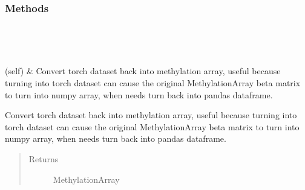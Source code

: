 \documentclass[letterpaper,10pt,english]{sphinxmanual}
\begin{document}
\begin{fulllineitems}
\begin{quote}
\begin{description}
\begin{description}
\item[{}] \leavevmode
\item[{}] \leavevmode
\item[{}] \leavevmode
\end{description}

\end{description}\end{quote}
\subsubsection*{Methods}


\begin{savenotes}\sphinxatlongtablestart\begin{longtable}{}
\hline

\endfirsthead

%
{}\\
\hline

\endhead

\hline
{}\\
\endfoot

\endlastfoot

{\hyperref[\detokenize{index:methylnet.datasets.MethylationDataSet.to_methyl_array}]{}}(self)
&
Convert torch dataset back into methylation array, useful because turning into torch dataset can cause the original MethylationArray beta matrix to turn into numpy array, when needs turn back into pandas dataframe.
\\
\hline
\end{longtable}\sphinxatlongtableend\end{savenotes}

\begin{fulllineitems}
\label{\detokenize{index:methylnet.datasets.MethylationDataSet.to_methyl_array}}
Convert torch dataset back into methylation array, useful because turning into torch dataset can cause the original MethylationArray beta matrix to turn into numpy array, when needs turn back into pandas dataframe.
\begin{quote}\begin{description}
\item[{Returns}] \leavevmode\begin{description}
\item[{MethylationArray}] \leavevmode
\end{description}


\end{description}
\end{quote}
\end{fulllineitems}
\end{fulllineitems}
\end{document}
